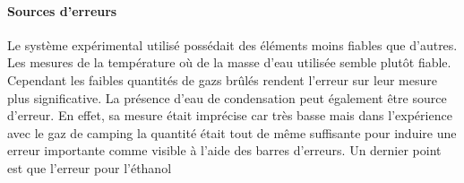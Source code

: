 \paragraph*{Sources d'erreurs}
Le système expérimental utilisé possédait des éléments moins fiables que d'autres. Les mesures de la température où de la masse d'eau utilisée semble plutôt fiable. Cependant les faibles quantités de gazs brûlés rendent l'erreur sur leur mesure plus significative. La présence d'eau de condensation peut également être source d'erreur. En effet, sa mesure était imprécise car très basse mais dans l'expérience avec le gaz de camping la quantité était tout de même suffisante pour induire une erreur importante comme visible à l'aide des barres d'erreurs. Un dernier point est que l'erreur pour l'éthanol

